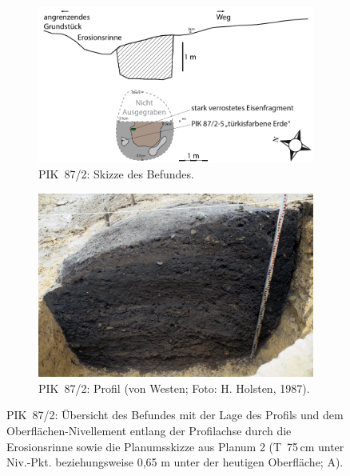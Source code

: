 \begin{figure}[tb!]
	\centering
	\begin{subfigure}[t]{\columnwidth}
		\centering
		\includegraphics[width=\columnwidth]{fig/PIK87-2.pdf}
		\caption{PIK~87/2: Skizze des Befundes.}
		\label{fig:PIK87-2_PlProfSkizze}	
	\end{subfigure}\hfill
	\begin{subfigure}[t]{\columnwidth}	
		\centering
		\includegraphics[width=\columnwidth]{fig/PIK87-2_Profil-H87-03-2.jpg}
		\caption{PIK~87/2: Profil (von Westen; Foto: H. Holsten, 1987).}
		\label{fig:PIK87-2_ProfilFoto}
	\end{subfigure}
	\caption{PIK~87/2: Übersicht des Befundes mit der Lage des Profils und dem Oberflächen-Nivellement entlang der Profilachse durch die Erosionsrinne sowie die Planumsskizze aus Planum 2 (T~75\,cm unter Niv.-Pkt. beziehungsweise 0,65 m unter der heutigen Oberfläche; A).}
	\label{fig:PIK87-2}
\end{figure}

